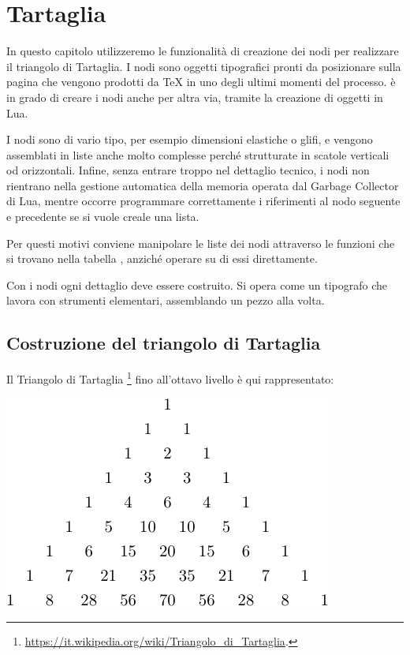 

\chapter{Tartaglia}
\label{iichTartaglia}

In questo capitolo utilizzeremo le funzionalità di creazione dei nodi per
realizzare il triangolo di Tartaglia. I nodi sono oggetti tipografici pronti da
posizionare sulla pagina che vengono prodotti da \TeX{} in uno degli ultimi
momenti del processo. \LuaTeX{} è in grado di creare i nodi anche per altra via,
tramite la creazione di oggetti in Lua.

I nodi sono di vario tipo, per esempio dimensioni elastiche o glifi, e vengono
assemblati in liste anche molto complesse perché strutturate in scatole
verticali od orizzontali. Infine, senza entrare troppo nel dettaglio tecnico, i
nodi non rientrano nella gestione automatica della memoria operata dal Garbage
Collector di Lua, mentre occorre programmare correttamente i riferimenti
al nodo seguente e precedente se si vuole creale una lista.

Per questi motivi conviene manipolare le liste dei nodi attraverso le funzioni
che si trovano nella tabella , anziché operare su di essi
direttamente.

Con i nodi ogni dettaglio deve essere costruito. Si opera come un tipografo
che lavora con strumenti elementari, assemblando un pezzo alla volta.


\section{Costruzione del triangolo di Tartaglia}

Il Triangolo di Tartaglia%
\footnote{\url{https://it.wikipedia.org/wiki/Triangolo_di_Tartaglia}.} fino
all'ottavo livello è qui rappresentato:
\begin{center}
\includegraphics{image/tart-triangolo.pdf}
\end{center}

